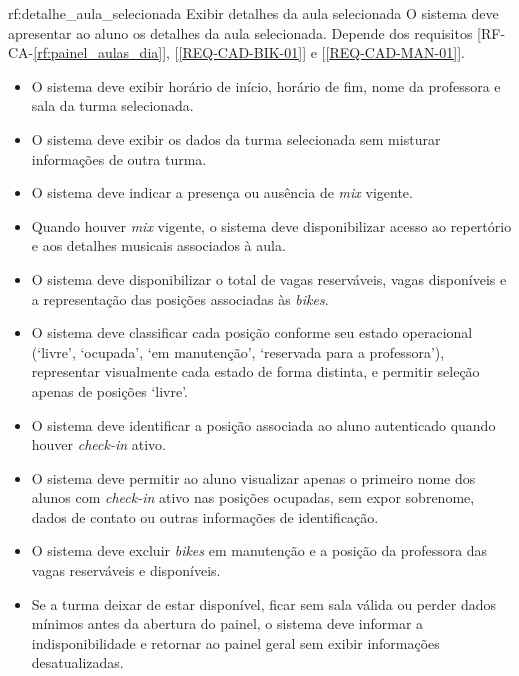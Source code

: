 \reqfunc
{rf:detalhe_aula_selecionada}
{Exibir detalhes da aula selecionada}
{O sistema deve apresentar ao aluno os detalhes da aula selecionada.}
{Depende dos requisitos [RF-CA-\ref{rf:painel_aulas_dia}], [\ref{REQ-CAD-BIK-01}] e [\ref{REQ-CAD-MAN-01}].}
{\begin{itemize}[leftmargin=0.6cm]
    \item O sistema deve exibir horário de início, horário de fim, nome da professora e sala da turma selecionada.
    \item O sistema deve exibir os dados da turma selecionada sem misturar informações de outra turma.
    \item O sistema deve indicar a presença ou ausência de \textit{mix} vigente.
    \item Quando houver \textit{mix} vigente, o sistema deve disponibilizar acesso ao repertório e aos detalhes musicais associados à aula.
    \item O sistema deve disponibilizar o total de vagas reserváveis, vagas disponíveis e a representação das posições associadas às \textit{bikes}.
    \item O sistema deve classificar cada posição conforme seu estado operacional (`livre', `ocupada', `em manutenção', `reservada para a professora'), representar visualmente cada estado de forma distinta, e permitir seleção apenas de posições `livre'.
    \item O sistema deve identificar a posição associada ao aluno autenticado quando houver \textit{check-in} ativo.
    \item O sistema deve permitir ao aluno visualizar apenas o primeiro nome dos alunos com \textit{check-in} ativo nas posições ocupadas, sem expor sobrenome, dados de contato ou outras informações de identificação.
    \item O sistema deve excluir \textit{bikes} em manutenção e a posição da professora das vagas reserváveis e disponíveis.
    \item Se a turma deixar de estar disponível, ficar sem sala válida ou perder dados mínimos antes da abertura do painel, o sistema deve informar a indisponibilidade e retornar ao painel geral sem exibir informações desatualizadas.
\end{itemize}}

